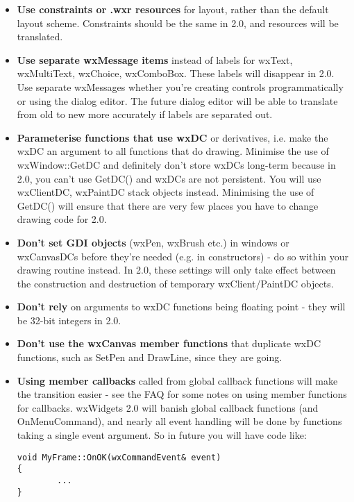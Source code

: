 \begin{itemize}
\item {\bf Use constraints or .wxr resources} for layout, rather than the default layout scheme.
Constraints should be the same in 2.0, and resources will be translated.
\item {\bf Use separate wxMessage items} instead of labels for wxText, wxMultiText,
wxChoice, wxComboBox. These labels will disappear in 2.0. Use separate
wxMessages whether you're creating controls programmatically or using
the dialog editor. The future dialog editor will be able to translate
from old to new more accurately if labels are separated out.
\item {\bf Parameterise functions that use wxDC} or derivatives, i.e. make the wxDC
an argument to all functions that do drawing. Minimise the use of
wxWindow::GetDC and definitely don't store wxDCs long-term
because in 2.0, you can't use GetDC() and wxDCs are not persistent.
You will use wxClientDC, wxPaintDC stack objects instead. Minimising
the use of GetDC() will ensure that there are very few places you
have to change drawing code for 2.0.
\item {\bf Don't set GDI objects} (wxPen, wxBrush etc.) in windows or wxCanvasDCs before they're
needed (e.g. in constructors) - do so within your drawing routine instead. In
2.0, these settings will only take effect between the construction and destruction
of temporary wxClient/PaintDC objects.
\item {\bf Don't rely} on arguments to wxDC functions being floating point - they will
be 32-bit integers in 2.0.
\item {\bf Don't use the wxCanvas member functions} that duplicate wxDC functions, such as SetPen and DrawLine, since
they are going.
\item {\bf Using member callbacks} called from global callback functions will make the transition
easier - see the FAQ
for some notes on using member functions for callbacks. wxWidgets 2.0 will banish global
callback functions (and OnMenuCommand), and nearly all event handling will be done by functions taking a single event argument.
So in future you will have code like:

{\small
\begin{verbatim}
void MyFrame::OnOK(wxCommandEvent& event)
{
        ...
}
\end{verbatim}
}%


\end{itemize}
